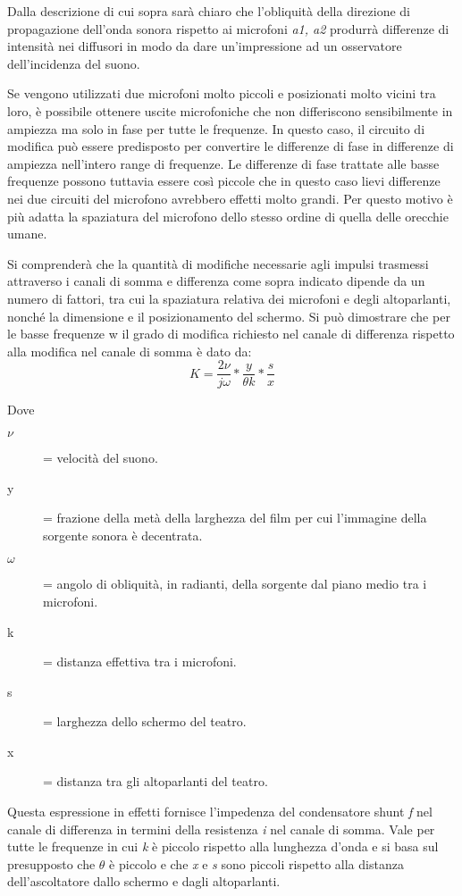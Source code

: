 \documentclass[11pt]{article}
\begin{document}
\begin{multicols*}{2}
Dalla descrizione di cui sopra sarà chiaro che l'obliquità della direzione di propagazione dell'onda sonora rispetto ai microfoni  \textit{a1, a2} produrrà differenze di intensità nei diffusori in modo da dare un'impressione ad un osservatore dell’incidenza del suono.

Se vengono utilizzati due microfoni molto piccoli e posizionati molto vicini tra loro, è possibile ottenere uscite microfoniche che non differiscono sensibilmente in ampiezza ma solo in fase per tutte le frequenze. In questo caso, il circuito di modifica può essere predisposto per convertire le differenze di fase in differenze di ampiezza nell'intero range di frequenze. Le differenze di fase trattate alle basse frequenze possono tuttavia essere così piccole che in questo caso lievi differenze nei due circuiti del microfono avrebbero effetti molto grandi. Per questo motivo è più adatta la spaziatura del microfono dello stesso ordine di quella delle orecchie umane.

Si comprenderà che la quantità di modifiche necessarie agli impulsi trasmessi attraverso i canali di somma e differenza come sopra indicato dipende da un numero di fattori, tra cui la spaziatura relativa dei microfoni e degli altoparlanti, nonché la dimensione e il posizionamento del schermo. Si può dimostrare che per le basse frequenze w il grado di modifica richiesto nel canale di differenza rispetto alla modifica nel canale di somma è dato da:
\[
K = \frac{2\nu}{j\omega} * \frac{y}{\theta k} * \frac{s}{x}
\]

Dove
\begin{description}
	\item [$\nu$] = velocità del suono.
	\item[y] = frazione della metà della larghezza del film per cui l’immagine della sorgente sonora è decentrata.
	\item[$\omega$] = angolo di obliquità, in radianti, della sorgente dal piano medio tra i microfoni.
	\item[k] = distanza effettiva tra i microfoni.
	\item[s] = larghezza dello schermo del teatro.
	\item[x] = distanza tra gli altoparlanti del teatro.
\end{description}

Questa espressione in effetti fornisce l'impedenza del condensatore shunt \textit{f} nel canale di differenza in termini della resistenza \textit{i} nel canale di somma. Vale per tutte le frequenze in cui \textit{k} è piccolo rispetto alla lunghezza d'onda e si basa sul presupposto che $\theta$ è piccolo e che \textit{x} e \textit{s} sono piccoli rispetto alla distanza dell'ascoltatore dallo schermo e dagli altoparlanti.


\end{multicols*}
\end{document}
